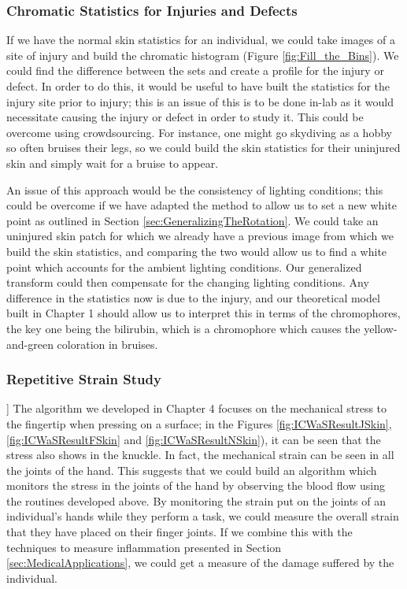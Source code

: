 \subsubsection{Chromatic Statistics for Injuries and Defects}\label{sec:ChromaticStatisticsForInjuriesAndDefects}
If we have the normal skin statistics for an individual, we could take images of a site of injury and build the chromatic histogram (Figure \ref{fig:Fill_the_Bins}). We could find the difference between the sets and create a profile for the injury or defect. In order to do this, it would be useful to have built the statistics for the injury site prior to injury; this is an issue of this is to be done in-lab as it would necessitate causing the injury or defect in order to study it. This could be overcome using crowdsourcing. For instance, one might go skydiving as a hobby so often bruises their legs, so we could build the skin statistics for their uninjured skin and simply wait for a bruise to appear. 

An issue of this approach would be the consistency of lighting conditions; this could be overcome if we have adapted the method to allow us to set a new white point as outlined in Section \ref{sec:GeneralizingTheRotation}. We could take an uninjured skin patch for which we already have a previous image from which we build the skin statistics, and comparing the two would allow us to find a white point which accounts for the ambient lighting conditions. Our generalized transform could then compensate for the changing lighting conditions. Any difference in the statistics now is due to the injury, and our theoretical model built in Chapter 1 should allow us to interpret this in terms of the chromophores, the key one being the bilirubin, which is a chromophore which causes the yellow-and-green coloration in bruises.

\subsubsection{Repetitive Strain Study}]\label{sec:RepetitiveStrainStudy}
The algorithm we developed in Chapter 4 focuses on the mechanical stress to the fingertip when pressing on a surface; in the Figures \ref{fig:ICWaSResultJSkin}, \ref{fig:ICWaSResultFSkin} and \ref{fig:ICWaSResultNSkin}), it can be seen that the stress also shows in the knuckle. In fact, the mechanical strain can be seen in all the joints of the hand. This suggests that we could build an algorithm which monitors the stress in the joints of the hand by observing the blood flow using the routines developed above. By monitoring the strain put on the joints of an individual's hands while they perform a task, we could measure the overall strain that they have placed on their finger joints. If we combine this with the techniques to measure inflammation presented in Section \ref{sec:MedicalApplications}, we could get a measure of the damage suffered by the individual. 

